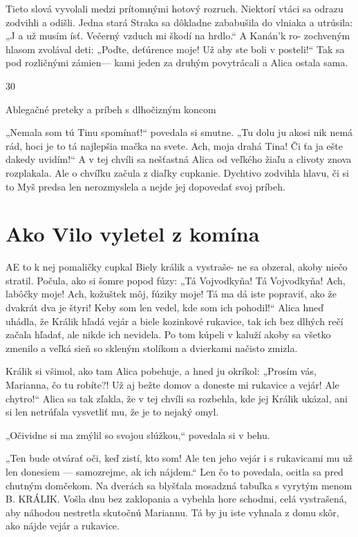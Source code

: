 \documentclass[12pt]{book}
\begin{document}
\begin{Parallel}[p]{}{}
{Tieto slová vyvolali medzi prítomnými hotový rozruch.
Niektorí vtáci sa odrazu zodvihli a odišli. Jedna stará Straka
sa dôkladne zababušila do vlniaka a utrúsila: „J a už musím
ísť. Večerný vzduch mi škodí na hrdlo.“ A Kanán'k ro-
zochveným hlasom zvolával deti: „Poďte, deťúrence moje!
Už aby ste boli v posteli!“ Tak sa pod rozličnými zámien—
kami jeden za druhým povytrácali a Alica ostala sama.

30

Ablegačné preteky a príbeh s dlhočizným koncom

„Nemala som tú Tinu spomínať!“ povedala si smutne.
„Tu dolu ju akosi nik nemá rád, hoci je to tá najlepšia mačka
na svete. Ach, moja drahá Tina! Či ťa ja ešte dakedy
uvidím!“ A v tej chvíli sa nešťastná Alica od veľkého žiaľu
a clivoty znova rozplakala. Ale o chvíľku začula z diaľky
cupkanie. Dychtivo zodvihla hlavu, či si to Myš predsa len
nerozmyslela a nejde jej dopovedať svoj príbeh.

\section{Ako Vilo vyletel z komína}

AE to k nej pomaličky cupkal Biely králik a vystraše-
ne sa obzeral, akoby niečo stratil. Počula, ako si
šomre popod fúzy: „Tá Vojvodkyňa! Tá Vojvodkyňa! Ach,
labôčky moje! Ach, kožuštek môj, fúziky moje! Tá ma dá
iste popraviť, ako že dvakrát dva je štyri! Keby som len
vedel, kde som ich pohodil!“ Alica hneď uhádla, že Králik
hľadá vejár a biele kozinkové rukavice, tak ich bez dlhých
rečí začala hľadať, ale nikde ich nevidela. Po tom kúpeli
v kaluží akoby sa všetko zmenilo a veľká sieň so skleným
stolíkom a dvierkami načisto zmizla.

Králik si všimol, ako tam Alica pobehuje, a hned ju
okríkol: „Prosím vás, Marianna, čo tu robíte?! Už aj bežte
domov a doneste mi rukavice a vejár! Ale chytro!“ Alica sa
tak zľakla, že v tej chvíli sa rozbehla, kde jej Králik ukázal,
ani si len netrúfala vysvetliť mu, že je to nejaký omyl.

„Očividne si ma zmýlil so svojou slúžkou,“ povedala si
v behu.

„Ten bude otvárať oči, keď zistí, kto som! Ale ten jeho
vejár i s rukavicami mu už len donesiem — samozrejme, ak
ich nájdem.“ Len čo to povedala, ocitla sa pred chutným
domčekom. Na dverách sa blyšťala mosadzná tabuľka
s vyrytým menom B. KRÁLIK. Vošla dnu bez zaklopania
a vybehla hore schodmi, celá vystrašená, aby náhodou
nestretla skutočnú Mariannu. Tá by ju iste vyhnala z domu
skôr, ako nájde vejár a rukavice.

}
\end{Parallel}
\end{document}
